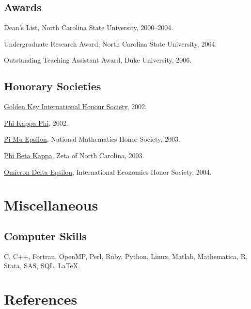\documentclass[letterpaper]{article}
\renewenvironment{itemize}{
  \begin{list}{}{
    \setlength{\leftmargin}{1em}
  }
}{
  \end{list}
}
\begin{document}
\subsection*{Awards}

\begin{itemize}
\item Dean's List, North Carolina State University, 2000--2004.
\item Undergraduate Research Award, North Carolina State University, 2004.
\item Outstanding Teaching Assistant Award, Duke University, 2006.
\end{itemize}

\subsection*{Honorary Societies}

\begin{itemize}
\item \href{http://www.goldenkey.org}{Golden Key International
    Honour Society}, 2002.
\item \href{http://www.phikappaphi.org/}{Phi Kappa Phi}, 2002.
\item \href{http://www.pme-math.org/}{Pi Mu Epsilon},
  National Mathematics Honor Society,
  2003.
\item \href{http://www.pbk.org/}{Phi Beta Kappa}, Zeta of North Carolina, 2003.
\item \href{http://www.cba.ua.edu/~ode/}{Omicron Delta Epsilon},
  International Economics Honor Society,
  2004.
\end{itemize}

\section*{Miscellaneous}

\subsection*{Computer Skills}

C, C++, Fortran, OpenMP, Perl, Ruby, Python, Linux,
Matlab, Mathematica, R, Stata, SAS, SQL, \LaTeX.

\section*{References}
\end{document}
